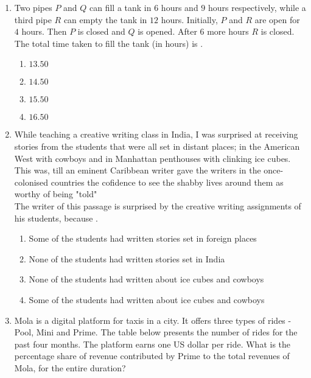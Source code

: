 \documentclass[journal,12pt,onecolumn]{IEEEtran}
\theoremstyle{remark}
\begin{document}
\begin{enumerate}
	\item Two pipes $P$ and $Q$ can fill a tank in $6$ hours and $9$ hours respectively, while a third pipe $R$ can empty the tank in $12$ hours. Initially, $P$ and $R$ are open for $4$ hours. Then $P$ is closed and $Q$ is opened. After $6$ more hours $R$ is closed. The total time taken to fill the tank (in hours) is \underline{\hspace{2cm}}.
		\begin{enumerate}                           
                        \item $13.50$                  
                        \item $14.50$                 
                        \item $15.50$
                        \item $16.50$
		\end{enumerate}
	\item While teaching a creative writing class in India, I was surprised at receiving stories from the students that were all set in distant places; in the American West with cowboys and in Manhattan penthouses with clinking ice cubes. This was, till an eminent Caribbean writer gave the writers in the once-colonised countries the cofidence to see the shabby lives around them as worthy of being "told"\\ The writer of this passage is surprised by the creative writing assignments of his students, because \underline{\hspace{2cm}}.
		\begin{enumerate}
			\item Some of the students had written stories set in foreign places
			\item None of the students had written stories set in India
			\item None of the students had written about ice cubes and cowboys
			\item Some of the students had written about ice cubes and cowboys
		\end{enumerate}
	\item Mola is a digital platform for taxis in a city. It offers three types of rides - Pool, Mini and Prime. The table below presents the number of rides for the past four months. The platform earns one US dollar per ride. What is the percentage share of revenue contributed by Prime to the total revenues of Mola, for the entire duration?
\begin{table}[h!]
\centering
\begin{tabular}{|c|c|c|c|c|}

\end{tabular}
\end{table}
\end{enumerate}
\end{document}
